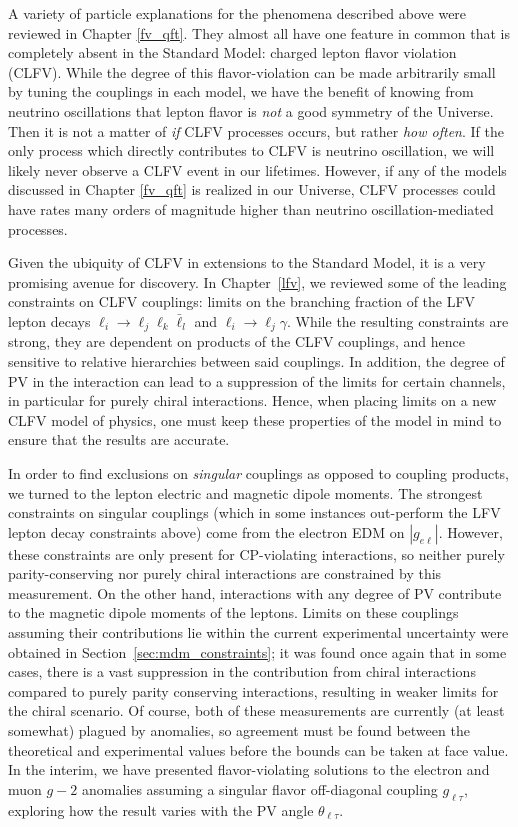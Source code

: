 A variety of particle explanations for the phenomena described above were reviewed in Chapter \ref{fv_qft}. They almost all have one feature in common that is completely absent in the Standard Model: charged lepton flavor violation (CLFV). While the degree of this flavor-violation can be made arbitrarily small by tuning the couplings in each model, we have the benefit of knowing from neutrino oscillations that lepton flavor is {\it not} a good symmetry of the Universe.  Then it is not a matter of {\it if} CLFV processes occurs, but rather {\it how often}. If the only process which directly contributes to CLFV is neutrino oscillation, we will likely never observe a CLFV event in our lifetimes. However, if any of the models discussed in Chapter \ref{fv_qft} is realized in our Universe, CLFV processes could have rates many orders of magnitude higher than neutrino oscillation-mediated processes.

Given the ubiquity of CLFV in extensions to the Standard Model, it is a very promising avenue for discovery. In Chapter~\ref{lfv}, we reviewed some of the leading constraints on CLFV couplings: limits on the branching fraction of the LFV lepton decays $\ell_i \rightarrow \ell_j \ell_k\bar{\ell}_l$ and $\ell_i \rightarrow \ell_j \gamma$. While the resulting constraints are strong, they are dependent on products of the CLFV couplings, and hence sensitive to relative hierarchies between said couplings. In addition, the degree of PV in the interaction can lead to a suppression of the limits for certain channels, in particular for purely chiral interactions. Hence, when placing limits on a new CLFV model of physics, one must keep these properties of the model in mind to ensure that the results are accurate. 

In order to find exclusions on {\it singular} couplings as opposed to coupling products, we turned to the lepton electric and magnetic dipole moments. The strongest constraints on singular couplings (which in some instances out-perform the LFV lepton decay constraints above) come from the electron EDM on $|g_{e\ell}|$. However, these constraints are only present for CP-violating interactions, so neither purely parity-conserving nor purely chiral interactions are constrained by this measurement. On the other hand, interactions with any degree of PV contribute to the magnetic dipole moments of the leptons. Limits on these couplings assuming their contributions lie within the current experimental uncertainty were obtained in Section~\ref{sec:mdm_constraints}; it was found once again that in some cases, there is a vast suppression in the contribution from chiral interactions compared to purely parity conserving interactions, resulting in weaker limits for the chiral scenario. Of course, both of these measurements are currently (at least somewhat) plagued by anomalies, so agreement must be found between the theoretical and experimental values before the bounds can be taken at face value. In the interim, we have presented flavor-violating solutions to the electron and muon $g-2$ anomalies assuming a singular flavor off-diagonal coupling $g_{\ell\tau}$, exploring how the result varies with the PV angle $\theta_{\ell\tau}$.

